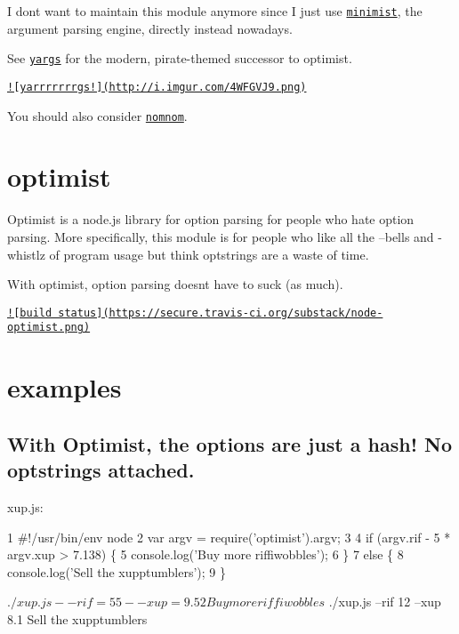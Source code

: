 I don\textquotesingle{}t want to maintain this module anymore since I just use \href{https://npmjs.org/package/minimist}{\tt minimist}, the argument parsing engine, directly instead nowadays.

See \href{https://github.com/chevex/yargs}{\tt yargs} for the modern, pirate-\/themed successor to optimist.

\href{https://github.com/chevex/yargs}{\tt !\mbox{[}yarrrrrrrgs!\mbox{]}(http\+://i.\+imgur.\+com/4\+W\+F\+G\+V\+J9.\+png)}

You should also consider \href{https://github.com/harthur/nomnom}{\tt nomnom}.

\section*{optimist }

Optimist is a node.\+js library for option parsing for people who hate option parsing. More specifically, this module is for people who like all the --bells and -\/whistlz of program usage but think optstrings are a waste of time.

With optimist, option parsing doesn\textquotesingle{}t have to suck (as much).

\href{http://travis-ci.org/substack/node-optimist}{\tt !\mbox{[}build status\mbox{]}(https\+://secure.\+travis-\/ci.\+org/substack/node-\/optimist.\+png)}

\section*{examples }

\subsection*{With Optimist, the options are just a hash! No optstrings attached. }

xup.\+js\+:


\begin{DoxyCode}
1 #!/usr/bin/env node
2 var argv = require('optimist').argv;
3 
4 if (argv.rif - 5 * argv.xup > 7.138) \{
5     console.log('Buy more riffiwobbles');
6 \}
7 else \{
8     console.log('Sell the xupptumblers');
9 \}
\end{DoxyCode}




 \begin{DoxyVerb}$ ./xup.js --rif=55 --xup=9.52
Buy more riffiwobbles

$ ./xup.js --rif 12 --xup 8.1
Sell the xupptumblers
\end{DoxyVerb}




